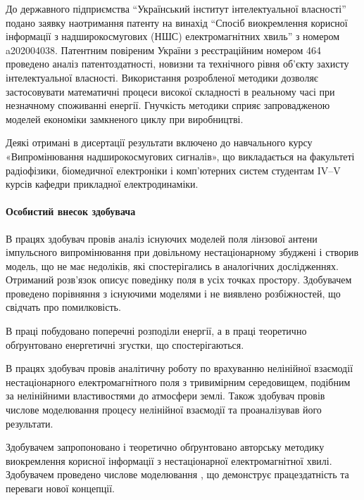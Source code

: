 До державного підприємства ``Український інститут інтелектуальної 
власності'' подано заявку наотримання патенту на  винахід ``Спосіб виокремлення 
корисної інформації з надширокосмугових (НШС) електромагнітних хвиль'' 
з номером a202004038. Патентним повіреним України з реєстраційним номером 
464 проведено аналіз патентоздатності, новизни та технічного рівня об'єкту 
захисту інтелектуальної власності. Використання розробленої методики дозволяє 
застосовувати математичні процеси високої складності в реальному часі 
при незначному споживанні енергії. Гнучкість методики  сприяє 
запровадженою моделей економіки замкненого циклу при виробництві.

Деякі отримані в дисертації результати включено до навчального курсу 
«Випромінювання надширокосмугових сигналів», що викладається на 
факультеті радіофізики, біомедичної електроніки і комп’ютерних систем
студентам IV--V курсів кафедри прикладної електродинаміки.


\paragraph{Особистий внесок здобувача}

В працях \cite{my:Telecom2018, my:UKRCON2017, my:UKRCON2019} здобувач провів
аналіз існуючих моделей поля лінзової антени імпульсного випромінювання 
при довільному нестаціонарному збуджені і створив модель, що не має недоліків,
які спостерігались в аналогічних дослідженнях. Отриманий розв'язок описує 
поведінку поля в усіх точках простору. Здобувачем проведено порівняння з 
існуючими моделями і не виявлено розбіжностей, що свідчать про помилковість.

В праці \cite{my:Vesnik2017-2} побудовано поперечні розподіли енергії, а
в праці \cite{imp:Vesnik2018} теоретично обґрунтовано енергетичні згустки, 
що спостерігаються.

В працях \cite{my:Vesnik2015, my:Vesnik2017, my:Vesnik2017-2, my:MMET2014, 
my:UWBUSIS2014, my:ICATT2015, my:UWBUSIS2016, my:KPI2016, my:DIPED2019} 
здобувач провів аналітичну роботу по врахуванню нелінійної взаємодії 
нестаціонарного електромагнітного поля з тривимірним середовищем, 
подібним за нелінійними властивостями до атмосфери землі. Також здобувач
провів числове моделювання процесу нелінійної взаємодії та проаналізував 
його результати.

Здобувачем запропоновано \cite{my:UWBUSIS2018} і теоретично обґрунтовано
\cite{my:TKEA2020} авторську методику виокремлення корисної інформації 
з нестаціонарної електромагнітної хвилі. Здобувачем проведено числове 
моделювання \cite{my:TKEA2020}, що демонструє працездатність 
та переваги нової концепції.


